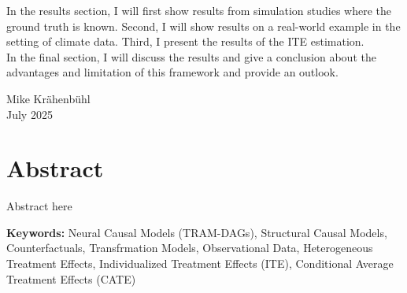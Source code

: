 \documentclass[11pt,a4paper,twoside]{book}
\begin{document}
In the results section, I will first show results from simulation studies where the 
ground truth is known. Second, I will show results on a real-world example in the
setting of climate data. Third, I present the results of the ITE estimation. \\ 

In the final section, I will discuss the results and give a conclusion about the 
advantages and limitation of this framework and provide an outlook.

\bigskip

\begin{flushright}
  Mike Kr{\"a}henb{\"u}hl\\
  July 2025
\end{flushright}


\cleardoublepage





\chapter*{Abstract}
\thispagestyle{plain}

Abstract here

\bigskip

\noindent\textbf{Keywords:} Neural Causal Models (TRAM-DAGs), Structural Causal Models, Counterfactuals, Transfrmation Models, Observational Data, Heterogeneous Treatment Effects, Individualized Treatment Effects (ITE), Conditional Average Treatment Effects (CATE)





\cleardoublepage






\end{document}
